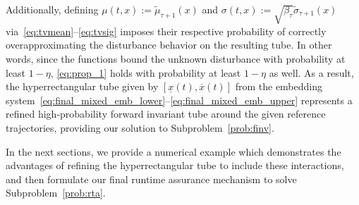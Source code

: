 \documentclass{IEEEojcsys}
\newcommand{\ul}{\underline}
\newcommand{\ol}{\overline}
\begin{document}
Additionally, defining $\mu(t, x) := \widetilde{\mu}_{\tau+1}(x)$ and $\sigma(t,x) := \sqrt{\beta_\tau}\widetilde{\sigma}_{\tau+1}(x)$ via~\eqref{eq:tvmean}--\eqref{eq:tvsig} imposes their respective probability of correctly overapproximating the disturbance behavior on the resulting tube. In other words, since the functions bound the unknown disturbance with probability at least $1-\eta$, \eqref{eq:prop_1} holds with probability at least $1-\eta$ as well. As a result, the hyperrectangular tube given by $[\ul{x}(t), \ol{x}(t)]$ from the embedding system~\eqref{eq:final_mixed_emb_lower}--\eqref{eq:final_mixed_emb_upper} represents a refined high-probability forward invariant tube around the given reference trajectories, providing our solution to Subproblem~\ref{prob:finv}. 

In the next sections, we provide a numerical example which demonstrates the advantages of refining the hyperrectangular tube to include these interactions, and then formulate our final runtime assurance mechanism to solve Subproblem~\ref{prob:rta}.
\end{document}
